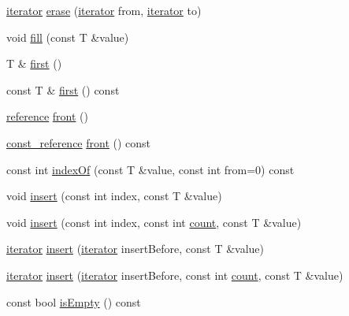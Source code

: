 \begin{DoxyCompactItemize}
\hyperlink{classprism_1_1_vector_aa547779173a63f6f8c9b2887498d10eb}{iterator} \hyperlink{classprism_1_1_vector_a170f8c53a09729cd04396604a982df59}{erase} (\hyperlink{classprism_1_1_vector_aa547779173a63f6f8c9b2887498d10eb}{iterator} from, \hyperlink{classprism_1_1_vector_aa547779173a63f6f8c9b2887498d10eb}{iterator} to)
\item 
void \hyperlink{classprism_1_1_vector_af9d17a636c708324bd373fb521da2941}{fill} (const T \&value)
\item 
T \& \hyperlink{classprism_1_1_vector_a1e2ec6951430f9850702ef7c95a13166}{first} ()
\item 
const T \& \hyperlink{classprism_1_1_vector_a5615ffd739ddca3ecadcc4357c4842c3}{first} () const 
\item 
\hyperlink{classprism_1_1_vector_a8ccf98342707efbed82918a44be97438}{reference} \hyperlink{classprism_1_1_vector_af37b66eb994e45fdaff93bc649a0561f}{front} ()
\item 
\hyperlink{classprism_1_1_vector_a75325487acaa0f63496c110e5a5632bb}{const\+\_\+reference} \hyperlink{classprism_1_1_vector_a3785411f25c191f68341fd8395d15440}{front} () const 
\item 
const int \hyperlink{classprism_1_1_vector_a0d0b833ffc1bc666624416e3b65181b4}{index\+Of} (const T \&value, const int from=0) const 
\item 
void \hyperlink{classprism_1_1_vector_aa9d6409134a4242f10ed6dbed1c5a91d}{insert} (const int index, const T \&value)
\item 
void \hyperlink{classprism_1_1_vector_a2712cf9aaa506332ae150e9e3f60abed}{insert} (const int index, const int \hyperlink{classprism_1_1_vector_ad40e1dc908502680797f37312dda7a4f}{count}, const T \&value)
\item 
\hyperlink{classprism_1_1_vector_aa547779173a63f6f8c9b2887498d10eb}{iterator} \hyperlink{classprism_1_1_vector_ac665dc2e7c506656fb4bbe3db303159c}{insert} (\hyperlink{classprism_1_1_vector_aa547779173a63f6f8c9b2887498d10eb}{iterator} insert\+Before, const T \&value)
\item 
\hyperlink{classprism_1_1_vector_aa547779173a63f6f8c9b2887498d10eb}{iterator} \hyperlink{classprism_1_1_vector_abbbb5974eb963ef66153271a4b6adf52}{insert} (\hyperlink{classprism_1_1_vector_aa547779173a63f6f8c9b2887498d10eb}{iterator} insert\+Before, const int \hyperlink{classprism_1_1_vector_ad40e1dc908502680797f37312dda7a4f}{count}, const T \&value)
\item 
const bool \hyperlink{classprism_1_1_vector_a23be1fddbb4bc27cabd6af5d1aa4ba91}{is\+Empty} () const 

\end{DoxyCompactItemize}
